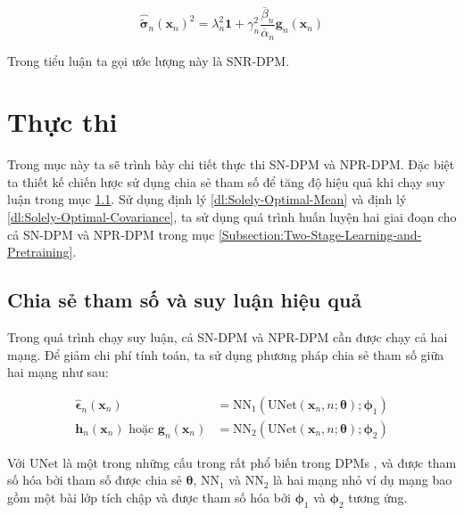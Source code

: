 \documentclass[14pt, a4paper]{article}
\numberwithin{equation}{section}
\numberwithin{figure}{section}
\numberwithin{dl}{section}
\numberwithin{md}{section}
\numberwithin{bd}{section}
\numberwithin{dn}{section}
\numberwithin{hq}{section}
\begin{document}
    \begin{equation} \label{eq:Sigma-NPR-DPM}
        \hat{\tilde{\boldsymbol{\sigma}}}_n (\boldsymbol{x}_n)^2 = \lambda_n^2 \boldsymbol{1} + \gamma_n^2 \dfrac{\overline{\beta}_n}{\overline{\alpha}_n} \boldsymbol{g}_n (\boldsymbol{x}_n)
    \end{equation}

    Trong tiểu luận ta gọi ước lượng này là SNR-DPM.

    \section{Thực thi} \label{Implementation}

    Trong mục này ta sẽ trình bày chi tiết thực thi SN-DPM và NPR-DPM.
    Đặc biệt ta thiết kế chiến lược sử dụng chia sẻ tham số để tăng độ hiệu quả khi chạy suy luận trong mục \ref{Parameter-Sharing-And-Inference-Efficiency}.
    Sử dụng định lý \ref{dl:Solely-Optimal-Mean} và định lý \ref{dl:Solely-Optimal-Covariance}, ta sử dụng quá trình huấn luyện hai giai đoạn cho cả SN-DPM và NPR-DPM trong mục \ref{Subsection:Two-Stage-Learning-and-Pretraining}.

    \subsection{Chia sẻ tham số và suy luận hiệu quả} \label{Parameter-Sharing-And-Inference-Efficiency}

    Trong quá trình chạy suy luận, cả SN-DPM và NPR-DPM cần được chạy cả hai mạng.
    Để giảm chi phí tính toán, ta sử dụng phương pháp chia sẻ tham số giữa hai mạng như sau:

    \begin{equation} \label{eq:Parameter-Sharing-Scheme}
        \begin{aligned}
        \hat{\boldsymbol{\epsilon}}_n (\boldsymbol{x}_n) &= \mathrm{NN}_1 (\mathrm{UNet}(\boldsymbol{x}_n, n ; \boldsymbol{\theta}); \boldsymbol{\phi}_1) \\
        \boldsymbol{h}_n (\boldsymbol{x}_n) \text{ hoặc } \boldsymbol{g}_n (\boldsymbol{x}_n) &= \mathrm{NN}_2(\mathrm{UNet}(\boldsymbol{x}_n, n; \boldsymbol{\theta}); \boldsymbol{\phi}_2)
        \end{aligned}
    \end{equation}

    Với $\mathrm{UNet}$ là một trong những cấu trong rất phổ biến trong DPMs \cite{ho2020denoising}, \cite{song2020score} và được tham số hóa bởi tham số được chia sẻ $\boldsymbol{\theta}$,
    $\mathrm{NN}_1$ và $\mathrm{NN}_2$ là hai mạng nhỏ ví dụ mạng bao gồm một bài lớp tích chập và được tham số hóa bởi $\boldsymbol{\phi}_1$ và $\boldsymbol{\phi}_2$ tương ứng.
\end{document}
